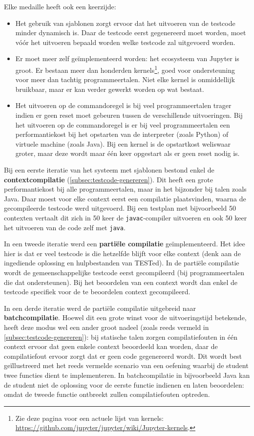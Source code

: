 Elke medaille heeft ook een keerzijde:
\begin{itemize}
    \item Het gebruik van sjablonen zorgt ervoor dat het uitvoeren van de testcode minder dynamisch is.
    Daar de testcode eerst gegenereerd moet worden, moet vóór het uitvoeren bepaald worden welke testcode zal uitgevoerd worden.
    \item Er moet meer zelf geïmplementeerd worden: het ecosysteem van Jupyter is groot.
    Er bestaan meer dan honderden kernels\footnote{Zie deze pagina voor een actuele lijst van kernels: \url{https://github.com/jupyter/jupyter/wiki/Jupyter-kernels}.}, goed voor ondersteuning voor meer dan tachtig programmeertalen.
    Niet elke kernel is onmiddellijk bruikbaar, maar er kan verder gewerkt worden op wat bestaat.
    \item Het uitvoeren op de commandoregel is bij veel programmeertalen trager indien er geen reset moet gebeuren tussen de verschillende uitvoeringen.
    Bij het uitvoeren op de commandoregel is er bij veel programmeertalen een performantiekost bij het opstarten van de interpreter (zoals Python) of virtuele machine (zoals Java).
    Bij een kernel is de opstartkost weliswaar groter, maar deze wordt maar één keer opgestart als er geen reset nodig is.
\end{itemize}

Bij een eerste iteratie van het systeem met sjablonen bestond enkel de \textbf{contextcompilatie} (\cref{subsec:testcode-genereren}).
Dit heeft een grote performantiekost bij alle programmeertalen, maar in het bijzonder bij talen zoals Java.
Daar moest voor elke context eerst een compilatie plaatsvinden, waarna de gecompileerde testcode werd uitgevoerd.
Bij een testplan met bijvoorbeeld 50 contexten vertaalt dit zich in 50 keer de \texttt{javac}-compiler uitvoeren en ook 50 keer het uitvoeren van de code zelf met \texttt{java}.

In een tweede iteratie werd een \textbf{partiële compilatie} geïmplementeerd.
Het idee hier is dat er veel testcode is die hetzelfde blijft voor elke context (denk aan de ingediende oplossing en hulpbestanden van TESTed).
In de partiële compilatie wordt de gemeenschappelijke testcode eerst gecompileerd (bij programmeertalen die dat ondersteunen).
Bij het beoordelen van een context wordt dan enkel de testcode specifiek voor de te beoordelen context gecompileerd.

In een derde iteratie werd de partiële compilatie uitgebreid naar \textbf{batchcompilatie}.
Hoewel dit een grote winst voor de uitvoeringstijd betekende, heeft deze modus wel een ander groot nadeel (zoals reeds vermeld in \cref{subsec:testcode-genereren}): bij statische talen zorgen compilatiefouten in één context ervoor dat geen enkele context beoordeeld kan worden, daar de compilatiefout ervoor zorgt dat er geen code gegenereerd wordt.
Dit wordt best geïllustreerd met het reeds vermelde scenario van een oefening waarbij de student twee functies dient te implementeren.
In batchcompilatie in bijvoorbeeld Java kan de student niet de oplossing voor de eerste functie indienen en laten beoordelen: omdat de tweede functie ontbreekt zullen compilatiefouten optreden.

